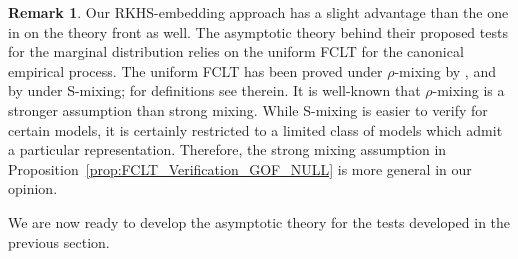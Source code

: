 \documentclass[11pt]{article}
\theoremstyle{plain}
\theoremstyle{definition}
\newtheorem{remark}{Remark}
\theoremstyle{remark}
\begin{document}
\begin{remark}
    Our RKHS-embedding approach has a slight advantage than the one in \cite{Zhang27032025} on the theory front as well. The asymptotic theory behind their proposed tests for the marginal distribution  relies on the uniform FCLT for the canonical empirical process. The uniform FCLT 
 has been proved under $\rho$-mixing by \cite{berkes1977almost}, and by \cite{berkes2009asymptotic} under S-mixing; for definitions see therein. It is well-known that $\rho$-mixing is a stronger assumption than strong mixing. While S-mixing is easier to verify for certain models, it is certainly restricted to a limited class of models which admit a particular representation. Therefore, the strong mixing assumption in Proposition~\ref{prop:FCLT_Verification_GOF_NULL} is more general in our opinion.
\end{remark}
We are now ready to develop the asymptotic theory for the tests developed in the previous section.
\end{document}
